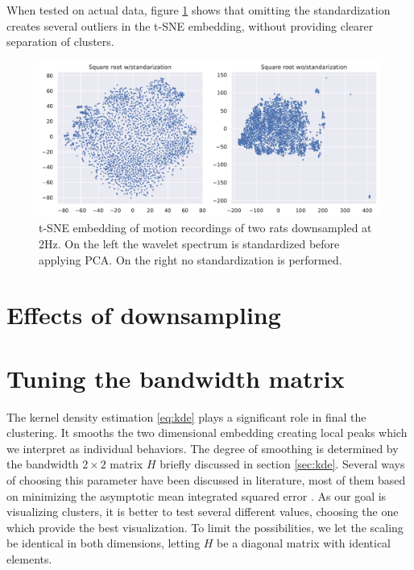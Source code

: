 \documentclass[a4paper, 10pt]{memoir}
\theoremstyle{plain}
\theoremstyle{definition}
\theoremstyle{remark}
\begin{document}
When tested on actual data, figure \ref{fig:test_scaling_example} shows that omitting the standardization creates several outliers in the t-SNE embedding, without providing clearer separation of clusters.
\begin{figure}[tb]
        \centering
        \includegraphics[width=1\linewidth]{./code/figures/test_scaling_example.pdf}
        \caption{t-SNE embedding of motion recordings of two rats downsampled at 2Hz.
        On the left the wavelet spectrum is standardized before applying PCA.
On the right no standardization is performed.}
        \label{fig:test_scaling_example}
\end{figure}


\section{Effects of downsampling}


\section{Tuning the bandwidth matrix}
The kernel density estimation \eqref{eq:kde} plays a significant role in final the clustering.
It smooths the two dimensional embedding creating local peaks which we interpret as individual behaviors.
The degree of smoothing is determined by the bandwidth $2 \times 2$ matrix $H$ briefly discussed in section \ref{sec:kde}.
Several ways of choosing this parameter have been discussed in literature, most of them based on minimizing the asymptotic mean integrated squared error \cite{simonoff}.
As our goal is visualizing clusters, it is better to test several different values, choosing the one which provide the best visualization.
To limit the possibilities, we let the scaling be identical in both dimensions, letting $H$ be a diagonal matrix with identical elements.
\end{document}
